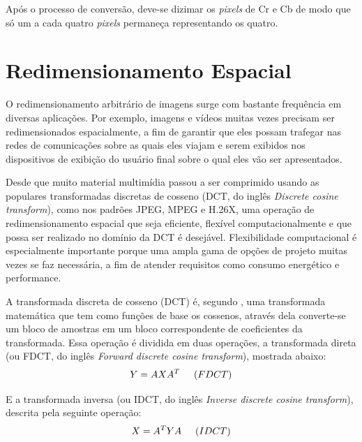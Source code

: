 \noindent Após o processo de conversão, deve-se dizimar os \textit{pixels} de Cr e Cb de modo que só um a cada quatro \textit{pixels} permaneça representando os quatro.

\section{Redimensionamento Espacial}
 \label{DCT}
O redimensionamento arbitrário de imagens surge com bastante frequência em diversas aplicações. Por exemplo, imagens e vídeos muitas vezes precisam ser redimensionados espacialmente, a fim de garantir que eles possam trafegar nas redes de comunicações sobre as quais eles viajam e serem exibidos nos dispositivos de exibição do usuário final sobre o qual eles vão ser apresentados. \cite{salazar2007complexity}
 
Desde que muito material multimídia passou a ser comprimido usando as populares transformadas discretas de cosseno (DCT, do inglês \textit{Discrete cosine transform}), como nos padrões JPEG, MPEG e H.26X, uma operação de redimensionamento espacial que seja eficiente, flexível computacionalmente e que possa ser realizado no domínio da DCT é desejável. Flexibilidade computacional é especialmente importante porque uma ampla gama de opções de projeto muitas vezes se faz necessária, a fim de atender requisitos como consumo energético e performance. \cite{salazar2007complexity}

A transformada discreta de cosseno (DCT) é, segundo , uma transformada matemática que tem como funções de base os cossenos, através dela converte-se um bloco de amostras em um bloco correspondente de coeficientes da transformada. Essa operação é dividida em duas operações, a transformada direta (ou FDCT, do inglês \textit{Forward discrete cosine transform}), mostrada abaixo:
\vspace{-3mm}
\begin{equation}
	\label{FDCT}
	Y = AXA^T \hspace{5mm} (FDCT)
\end{equation}

E a transformada inversa (ou IDCT, do inglês \textit{Inverse discrete cosine transform}), descrita pela seguinte operação:
\vspace{-3mm}
\begin{equation}
	\label{IDCT}
	X = A^TYA \hspace{5mm} (IDCT)
\end{equation}

